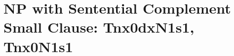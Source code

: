 


\section{NP with Sentential Complement Small Clause: Tnx0dxN1s1, Tnx0N1s1}
\label{nx0N1s1-family}

